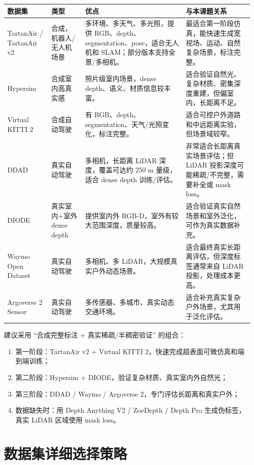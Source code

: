 \documentclass[11pt,a4paper,fontset=none]{ctexart}
\begin{document}
\begin{longtable}{p{2.6cm}p{3.2cm}p{4.2cm}p{4.4cm}}
\toprule
数据集 & 类型 & 优点 & 与本课题关系 \\
\midrule
\endhead
TartanAir / TartanAir v2 &
合成，机器人/无人机场景 &
多环境、多天气、多光照，提供 RGB、depth、segmentation、pose，适合无人机和 SLAM；部分版本支持全景/多相机。 &
最适合第一阶段仿真，能快速生成宽视场、运动、自然复杂场景，标注完整。 \\
\addlinespace
Hypersim &
合成室内高真实感 &
照片级室内场景，dense depth、语义、材质信息较丰富。 &
适合验证自然光、复杂材质、密集深度重建，但偏室内，长距离不足。 \\
\addlinespace
Virtual KITTI 2 &
合成自动驾驶 &
有 RGB、depth、segmentation、天气/光照变化，标注完整。 &
适合可控户外道路和中远距离实验，但场景域较窄。 \\
\addlinespace
DDAD &
真实自动驾驶 &
多相机，长距离 LiDAR 深度，覆盖可达约 250 m 量级，适合 dense depth 训练/评估。 &
非常适合长距离真实场景评估；但 LiDAR 投影深度可能稀疏/不完整，需要补全或 mask loss。 \\
\addlinespace
DIODE &
真实室内+室外 dense depth &
提供室内外 RGB-D，室外有较大范围深度，质量较高。 &
适合验证真实自然场景和室外泛化，可作为真实数据补充。 \\
\addlinespace
Waymo Open Dataset &
真实自动驾驶 &
多相机、多 LiDAR，大规模真实户外动态场景。 &
适合最终真实长距离评估，但深度标签通常来自 LiDAR 投影，处理成本更高。 \\
\addlinespace
Argoverse 2 Sensor &
真实自动驾驶 &
多传感器、多城市、真实动态交通环境。 &
适合补充真实复杂户外场景，尤其用于泛化评估。 \\
\bottomrule
\end{longtable}

建议采用 ``合成完整标注 + 真实稀疏/半稠密验证'' 的组合：
\begin{enumerate}
  \item 第一阶段：TartanAir v2 + Virtual KITTI 2，快速完成超表面可微仿真和端到端训练；
  \item 第二阶段：Hypersim + DIODE，验证复杂材质、真实室内外自然光；
  \item 第三阶段：DDAD / Waymo / Argoverse 2，专门评估长距离和真实户外；
  \item 数据缺失时：用 Depth Anything V2 / ZoeDepth / Depth Pro 生成伪标签，真实 LiDAR 区域使用 mask loss。
\end{enumerate}

\section{数据集详细选择策略}
\end{document}
